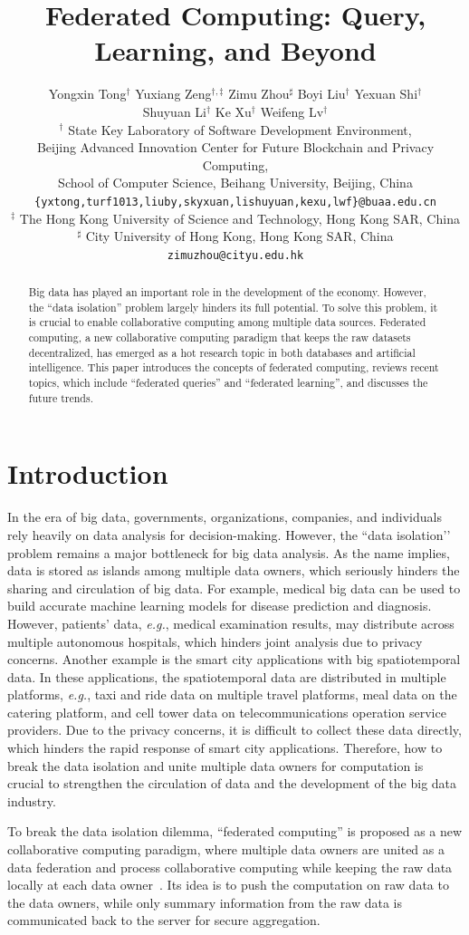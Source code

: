 \documentclass[11pt]{article}
\title{Federated Computing: Query, Learning, and Beyond}
\author{Yongxin Tong$^{\dagger}$
\hspace{1em} Yuxiang Zeng$^{\dagger,\ddagger}$
\hspace{1em} Zimu Zhou$^{\sharp}$
\hspace{1em} Boyi Liu$^{\dagger}$
\hspace{1em} Yexuan Shi$^{\dagger}$\\
\hspace{1em} Shuyuan Li$^{\dagger}$
\hspace{1em} Ke Xu$^{\dagger}$
\hspace{1em} Weifeng Lv$^{\dagger}$
\\
$^{\dagger}$ State Key Laboratory of Software Development Environment,\\
Beijing Advanced
Innovation Center for Future Blockchain and Privacy Computing, \\
School of Computer Science, Beihang University, Beijing, China \\
\texttt{\small\{yxtong,turf1013,liuby,skyxuan,lishuyuan,kexu,lwf\}@buaa.edu.cn} \\
$^{\ddagger}$ The Hong Kong University of Science and Technology, Hong Kong SAR, China \\
$^{\sharp}$ City University of Hong Kong, Hong Kong SAR, China \hspace{1em} \texttt{\small zimuzhou@cityu.edu.hk}
}
\newcommand{\eg}{\textit{e.g.},\xspace}
\begin{document}
\maketitle

\begin{abstract}\label{sec:abstract}
Big data has played an important role in the development of the economy.
However, the ``data isolation'' problem largely hinders its full potential.
To solve this problem, it is crucial to enable collaborative computing among multiple data sources.
Federated computing, a new collaborative computing paradigm that keeps the raw datasets decentralized, has emerged as a hot research topic in both databases and artificial intelligence.
This paper introduces the concepts of federated computing, reviews recent topics, which include ``federated queries'' and ``federated learning'', and discusses the future trends.

\end{abstract}

\section{Introduction}\label{sec:introduction}
In the era of big data, governments, organizations, companies, and individuals rely heavily on data analysis for decision-making.
However, the ``data isolation’’ problem remains a major bottleneck for big data analysis.
As the name implies, data is stored as islands among multiple data owners, which seriously hinders the sharing and circulation of big data.
For example, medical big data can be used to build accurate machine learning models for disease prediction and diagnosis.
However, patients' data, \eg medical examination results, may distribute across multiple autonomous hospitals, which hinders joint analysis due to privacy concerns.
Another example is the smart city applications with big spatiotemporal data.
In these applications, the spatiotemporal data are distributed in multiple platforms, \eg taxi and ride data on multiple travel platforms, meal data on the catering platform, and cell tower data on telecommunications operation service providers. Due to the privacy concerns, it is difficult to collect these data directly, which hinders the rapid response of smart city applications.
Therefore, how to break the data isolation and unite multiple data owners for computation is crucial to strengthen the circulation of data and the development of the big data industry.

To break the data isolation dilemma, ``federated computing'' is proposed as a new collaborative computing paradigm, where multiple data owners are united as a data federation and process collaborative computing while keeping the raw data locally at each data owner~\cite{Yongxin-DBLP:journals/tist/YangLCT19,Yongxin-ref_bater2017smcql,Yongxin-DBLP:conf/sigmod/BharadwajC22}.
Its idea is to push the computation on raw data to the data owners, while only summary information from the raw data is communicated back to the server for secure aggregation.
\end{document}
